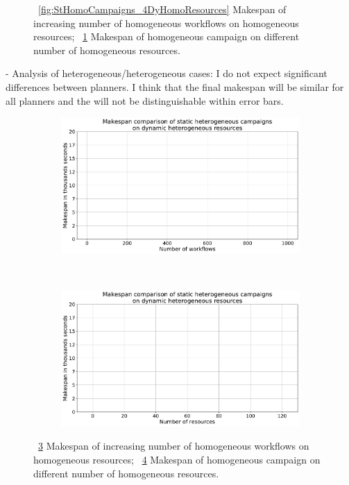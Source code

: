 \begin{figure}[ht!]
\begin{subfigure}[b]{0.45\textwidth}
        \caption{}
        \label{fig:DyHomoResources_StHomoCampaigns}
    \end{subfigure}
    \caption{~\ref{fig:StHomoCampaigns_4DyHomoResources} Makespan of increasing number of homogeneous workflows on homogeneous resources;
        ~\ref{fig:DyHomoResources_StHomoCampaigns} Makespan of homogeneous campaign on different number of homogeneous resources.}
    \label{fig:no_replan_homog_analysis}
\end{figure}


- Analysis of heterogeneous/heterogeneous cases:
I do not expect significant differences between planners.
I think that the final makespan will be similar for all planners and the will not be distinguishable within error bars.
\begin{figure}[ht!]
    \centering
    \begin{subfigure}[b]{0.45\textwidth}
        \includegraphics[width=.95\textwidth]{figures/campaign/StHeteroCampaigns_4DyHeteroResources.pdf}
        \caption{}
        \label{fig:StHeteroCampaigns_4DyHeteroResources}
    \end{subfigure}%
    ~ 
    \begin{subfigure}[b]{0.45\textwidth}
        \includegraphics[width=\linewidth]{figures/campaign/DyHeteroResources_StHeteroCampaigns.pdf}
        \caption{}
        \label{fig:DyHeteroResources_StHeteroCampaigns}
    \end{subfigure}
    \caption{~\ref{fig:StHeteroCampaigns_4DyHeteroResources} Makespan of increasing number of homogeneous workflows on homogeneous resources;
    ~\ref{fig:DyHeteroResources_StHeteroCampaigns} Makespan of homogeneous campaign on different number of homogeneous resources.}
    \label{fig:no_replan_hetero_analysis}
\end{figure}

